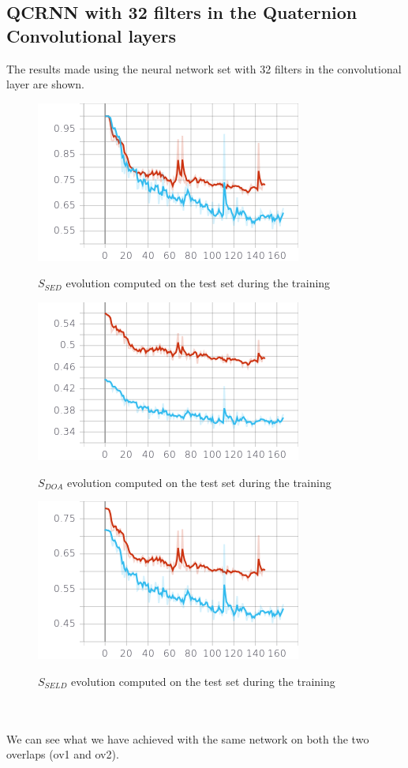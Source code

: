 \documentclass{article}
\begin{document}
	\subsection*{QCRNN with 32 filters in the Quaternion Convolutional layers}
	The results made using the neural network set with 32 filters in the convolutional layer are shown.
	\begin{figure}[hbt!]
		\centering
		\includegraphics[height=0.29\textwidth]{images/sed_score.png} \\
		\caption{$S_{SED}$ evolution computed on the test set during the training}
	\end{figure}
	\begin{figure}[hbt!]
		\centering
		\includegraphics[height=0.29\textwidth]{images/doa_score.png} \\
		\caption{$S_{DOA}$ evolution computed on the test set during the training}
	\end{figure}
	\begin{figure}[hbt!]
		\centering
		\includegraphics[height=0.29\textwidth]{images/seld_score.png}\\
		\caption{$S_{SELD}$ evolution computed on the test set during the training}
	\end{figure}
    \\ \\ We can see what we have achieved with the same network on both the two overlaps (ov1 and ov2). 
\end{document}
